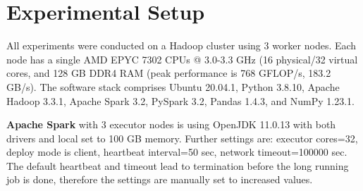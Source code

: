 \section{Experimental Setup}
\label{sec:experimental_setup}

All experiments were conducted on a Hadoop cluster using 3 worker nodes. 
Each node has a single AMD EPYC 7302 CPUs @ 3.0-3.3 GHz (16 physical/32 virtual cores, and 128 GB DDR4 RAM (peak performance is 768 GFLOP/s, 183.2 GB/s).
The software stack comprises Ubuntu 20.04.1, Python 3.8.10, Apache Hadoop 3.3.1, Apache Spark 3.2, PySpark 3.2, Pandas 1.4.3, and NumPy 1.23.1.

\textbf{Apache Spark} with 3 executor nodes is using OpenJDK 11.0.13 with both drivers and local set to 100 GB memory.
Further settings are: executor cores=32, deploy mode is client, heartbeat interval=50 sec, network timeout=100000 sec.
The default heartbeat and timeout lead to termination before the long running job is done, therefore the settings are manually set to increased values.
